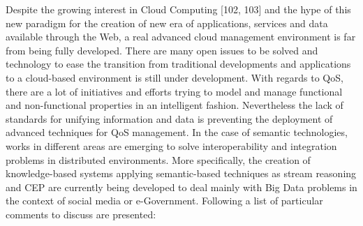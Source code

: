 Despite the growing interest in Cloud Computing [102, 103] and the hype of this new paradigm for the creation of new era of applications, services and data available through the Web, a real advanced cloud management environment is far from being fully developed. There are many open issues to be solved and technology to ease the transition from traditional developments and applications to a cloud-based environment is still under development. With regards to QoS, there are a lot of initiatives and efforts trying to model and manage functional and non-functional properties in an intelligent fashion. Nevertheless the lack of standards for unifying information and data is preventing the deployment of advanced techniques for QoS management. In the case of semantic technologies, works in different areas are emerging to solve interoperability and integration problems in distributed environments. More specifically, the creation of knowledge-based systems applying semantic-based techniques as stream reasoning and CEP are currently being developed to deal mainly with Big Data problems in the context of social media or e-Government. Following a list of particular comments to discuss are presented:
